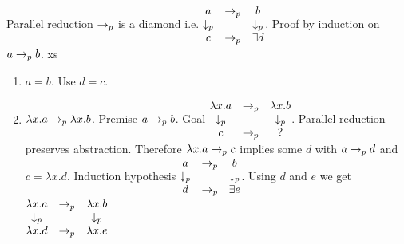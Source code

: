 \documentclass{article}
\begin{document}
\begin{theorem}
  Parallel reduction $\to_{p}$ is a diamond i.e.
  $\begin{matrix}
    a & \to_{p} & b \\
    \downarrow_p & & \downarrow_p \\
    c & \to_{p} & \exists d
  \end{matrix}
  $.
  Proof by induction on $a \to_{p} b$.
  xs\begin{enumerate}
  \item
    $a=b$. Use $d = c$.

  \item
    $\lambda x.a \to_{p} \lambda x.b$. Premise $a \to_{p} b$.
    Goal $
    \begin{matrix}
      \lambda x.a & \to_{p} & \lambda x.b \\
      \downarrow_p & & \downarrow_p \\
      c & \to_{p} & ?
    \end{matrix}    $.
    Parallel reduction preserves
    abstraction. Therefore $\lambda x.a \to_{p} c$ implies some $d$ with $a
    \to_{p} d$ and $c = \lambda x.d$.
    Induction hypothesis $
    \begin{matrix}
    a & \to_{p} & b \\
    \downarrow_p & & \downarrow_p \\
    d & \to_{p} & \exists e
  \end{matrix}$.
  Using $d$ and $e$ we get $
  \begin{matrix}
    \lambda x.a & \to_{p} & \lambda x.b \\
    \downarrow_p & & \downarrow_p \\
    \lambda x.d & \to_{p} & \lambda x.e
  \end{matrix} $


\end{enumerate}
\end{theorem}
\end{document}
